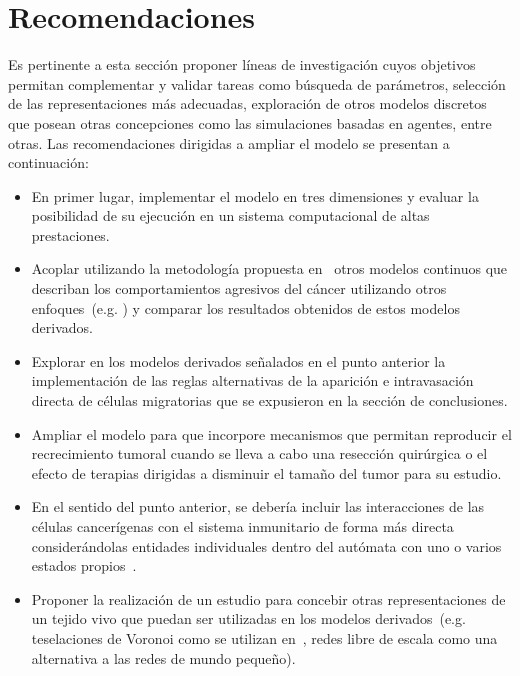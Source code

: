 \chapter{Recomendaciones}
Es pertinente a esta secci\'on proponer l\'ineas de investigaci\'on cuyos objetivos permitan complementar y validar tareas como b\'usqueda de par\'ametros, selecci\'on de las representaciones m\'as adecuadas, exploraci\'on de otros modelos discretos que posean otras concepciones como las simulaciones basadas en agentes, entre otras. Las recomendaciones dirigidas a ampliar el modelo se presentan a continuaci\'on:

\begin{itemize}
\item En primer lugar, implementar el modelo en tres dimensiones y evaluar la posibilidad de su ejecuci\'on en un sistema computacional de altas prestaciones. 

\item Acoplar utilizando la metodolog\'ia propuesta en~\cite{guinot} otros modelos continuos que describan los comportamientos agresivos del c\'ancer utilizando otros enfoques~(e.g. \cite{preziosi,preziosi2,kansal3,vascular}) y comparar los resultados obtenidos de estos modelos derivados.

\item Explorar en los modelos derivados se\~nalados en el punto anterior la implementaci\'on de las reglas alternativas de la aparici\'on e intravasaci\'on directa de c\'elulas migratorias que se expusieron en la secci\'on de conclusiones.

\item Ampliar el modelo para que incorpore mecanismos que permitan reproducir el recrecimiento tumoral cuando se lleva a cabo una resecci\'on quir\'urgica o el efecto de terapias dirigidas a disminuir el tama\~no del tumor para su estudio. 

\item En el sentido del punto anterior, se deber\'ia incluir las interacciones de las c\'elulas cancer\'igenas con el sistema inmunitario de forma m\'as directa consider\'andolas entidades individuales dentro del aut\'omata con uno o varios estados propios~\cite{ruanxiaoca}.

\item Proponer la realizaci\'on de un estudio para concebir otras representaciones de un tejido vivo que puedan ser utilizadas en los modelos derivados~(e.g. teselaciones de Voronoi como se utilizan en~\cite{kansal,kansal2,kansal3}, redes libre de escala como una alternativa a las redes de mundo peque\~no). 


\end{itemize}
